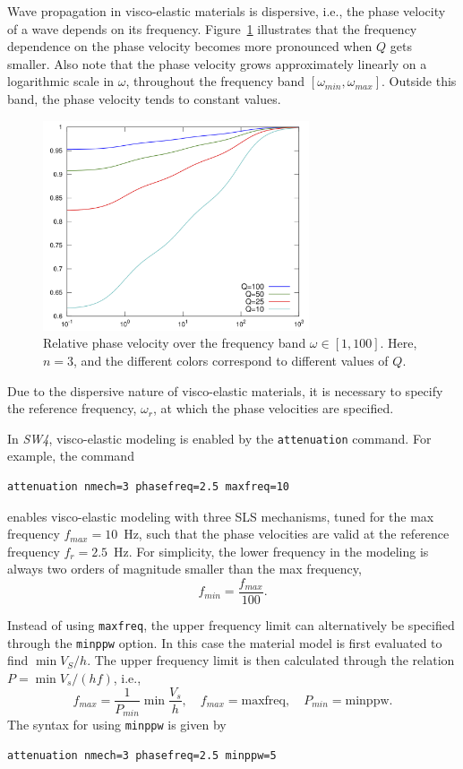 \documentclass[11pt]{report}
\begin{document}
Wave propagation in visco-elastic materials is dispersive, i.e., the phase velocity of a wave
depends on its frequency. Figure~\ref{fig:phase-velo} illustrates that the frequency dependence on
the phase velocity becomes more pronounced when $Q$ gets smaller. Also note that the phase velocity
grows approximately linearly on a logarithmic scale in $\omega$, throughout the frequency band
$[\omega_{min},\omega_{max}]$. Outside this band, the phase velocity tends to constant values.
\begin{figure}
\begin{centering}
\includegraphics[width=0.7\textwidth]{phase-velo2.png}
\caption{Relative phase velocity over the frequency band
  $\omega\in[1,100]$. Here, $n=3$, and the different colors correspond to different values of $Q$.}
\label{fig:phase-velo}
\end{centering}
\end{figure}
Due to the dispersive nature of visco-elastic materials, it is necessary to specify the reference
frequency, $\omega_r$, at which the phase velocities are specified.

In \emph{SW4}, visco-elastic modeling is enabled by the {\tt attenuation} command. For example, the
command
\begin{verbatim}
attenuation nmech=3 phasefreq=2.5 maxfreq=10
\end{verbatim}
enables visco-elastic modeling with three SLS mechanisms, tuned for the max frequency
$f_{max}=10$~Hz, such that the phase velocities are valid at the reference frequency
$f_r=2.5$~Hz. For simplicity, the lower frequency in the modeling is always two orders of
magnitude smaller than the max frequency,
\[
f_{min}=\frac{f_{max}}{100}.
\]

Instead of using \verb+maxfreq+, the upper frequency limit can alternatively be specified through the
\verb+minppw+ option. In this case the material model is first evaluated to find $\min V_S/h$. The
upper frequency limit is then calculated through the relation $P=\min V_s/(h
f)$, i.e.,
\[
f_{max} = \frac{1}{P_{min}}\min \frac{V_s}{h},\quad f_{max} = \mbox{maxfreq},\quad P_{min}=\mbox{minppw}.
\]
The syntax for using \verb+minppw+ is given by
\begin{verbatim}
attenuation nmech=3 phasefreq=2.5 minppw=5
\end{verbatim}
\end{document}
